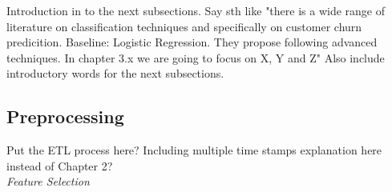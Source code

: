 \documentclass[12pt,titlepage]{article}
\begin{document}
Introduction in to the next subsections. Say sth like "there is a wide range of literature on classification techniques and specifically on customer churn predicition. Baseline: Logistic Regression. They propose following advanced techniques. In chapter 3.x we are going to focus on X, Y and Z" Also include introductory words for the next subsections. \\

\subsection{Preprocessing} \par

Put the ETL process here? Including multiple time stamps explanation here instead of Chapter 2? \\

\textit{Feature Selection}
\end{document}
